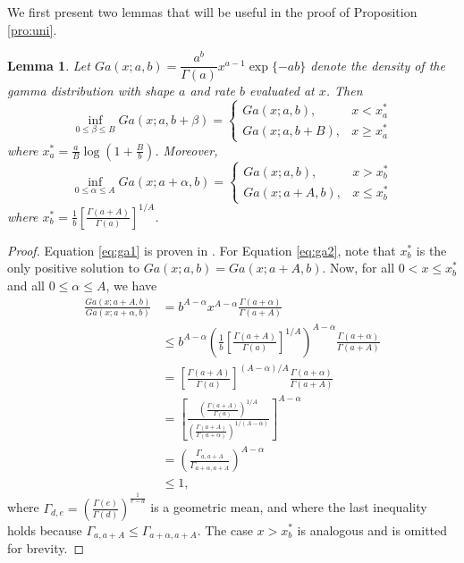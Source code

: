 \documentclass[11pt]{article}
\newtheorem{lemma}{Lemma}[section]
\begin{document}
	We first present two lemmas that will be useful in the proof of Proposition \ref{pro:uni}.
	\begin{lemma}
		\label{pro:ga1}
		Let $Ga(x;a,b) = \dfrac{a^b}{\Gamma(a)}x^{a-1}\exp\{-ab\}$ denote the density of the gamma distribution with shape $a$ and rate $b$ evaluated at $x$. Then
		\begin{equation}
			\label{eq:ga1}
			\inf_{0\le \beta\le B} Ga(x;a,b+\beta) = 
			\begin{cases}
				Ga(x;a,b), & x<x_a^* \\ Ga(x;a,b+B), & x\ge x_a^*
			\end{cases}
		\end{equation}	
		where $x_a^*=\frac{a}{B}\log\left( 1+\frac{B}{b}\right) $. Moreover,
		\begin{equation}
			\label{eq:ga2}
			\inf_{0\le \alpha\le A} Ga(x;a+\alpha,b) = 
			\begin{cases}
				Ga(x;a,b), & x>x_b^* \\ Ga(x;a+A,b), & x\le x_b^*
			\end{cases}
		\end{equation}
		where $x_b^*=\frac{1}{b}\left[ \frac{\Gamma(a+A)}{\Gamma(a)}\right]^{1/A}$. 
	\end{lemma}
	\begin{proof}
		Equation \ref{eq:ga1} is proven in \cite{Jones.2004}. For Equation \ref{eq:ga2}, note that $x_b^*$ is the only positive solution to $Ga(x;a,b) = Ga(x;a+A,b)$. Now, for all $0<x\le x_b^*$ and all $0\le\alpha\le A$, we have
		\begin{align*}
			\frac{Ga(x;a+A,b)}{Ga(x;a+\alpha,b)}
			& = b^{A-\alpha}x^{A-\alpha} \frac{\Gamma(a+\alpha)}{\Gamma(a+A)} \\
			& \le b^{A-\alpha}\left(\frac{1}{b}\left[ \frac{\Gamma(a+A)}{\Gamma(a)}\right]^{1/A} \right)^{A-\alpha} \frac{\Gamma(a+\alpha)}{\Gamma(a+A)} \\
			& = \left[ \frac{\Gamma(a+A)}{\Gamma(a)}\right]^{(A-\alpha)/A} \frac{\Gamma(a+\alpha)}{\Gamma(a+A)} \\
			& = \left[
			\frac{\left(\frac{\Gamma(a+A)}{\Gamma(a)}\right)^{1/A}}{\left(\frac{\Gamma(a+A)}{\Gamma(a+\alpha)}\right)^{1/(A-\alpha)}}
			\right]^{A-\alpha} \\
			& = \left( \frac{\Gamma_{a,a+A}}{\Gamma_{a+\alpha, a+A}}\right)^{A-\alpha} \\
			& \le 1,
		\end{align*}
		where $\Gamma_{d,e} = \left( \frac{\Gamma(e)}{\Gamma(d)} \right)^{\frac{1}{e-d}}$ is a geometric mean,
		and where the last inequality holds because $\Gamma_{a,a+A}\le\Gamma_{a+\alpha, a+A}$.
		The case $x>x_b^*$ is analogous and is omitted for brevity.
	\end{proof}
	
\end{document}
